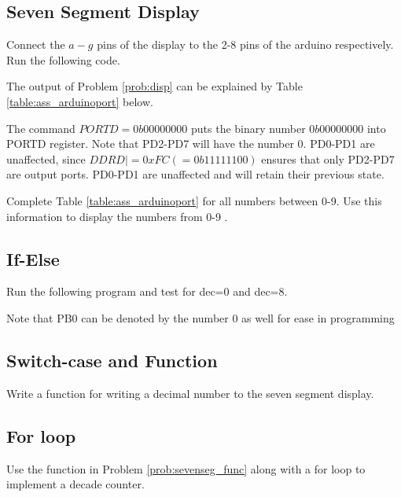 \documentclass[journal,12pt,twocolumn]{IEEEtran}
\begin{document}
\subsection{Seven Segment Display}
\begin{problem}
\label{prob:disp}
Connect the $a-g$ pins of the display to the 2-8 pins of the arduino respectively.  Run the following code.
\end{problem}
%

\begin{problem}
The output of Problem \ref{prob:disp} can be explained by Table \ref{table:ass_arduinoport} below. 	

The command $PORTD=0b00000000$ puts the binary number $0b00000000$ into PORTD register.  Note that PD2-PD7 will have the number 0.  PD0-PD1 are unaffected, since $DDRD|=0xFC (= 0b11111100)$ ensures that only PD2-PD7 are output ports.  PD0-PD1 are unaffected and will retain their previous state.

Complete Table \ref{table:ass_arduinoport} for all numbers between 0-9.
Use this information to display the numbers from 0-9 .

%
\end{problem}
%
\subsection{If-Else}
\begin{problem}
\label{prob:ifelseexample}
Run the following program and test for dec=0 and dec=8.
%
\end{problem}

Note that PB0 can be denoted by the number 0 as well for ease in programming
\subsection{Switch-case and Function}
\begin{problem}
\label{prob:sevenseg_func}
Write a function for writing a decimal number to the seven segment display.
\end{problem}
%
\solution

%
\subsection{For loop}
\begin{problem}
Use the function in Problem \ref{prob:sevenseg_func} along with a for loop to implement a decade counter.
\end{problem}
%
\solution

\end{document}
